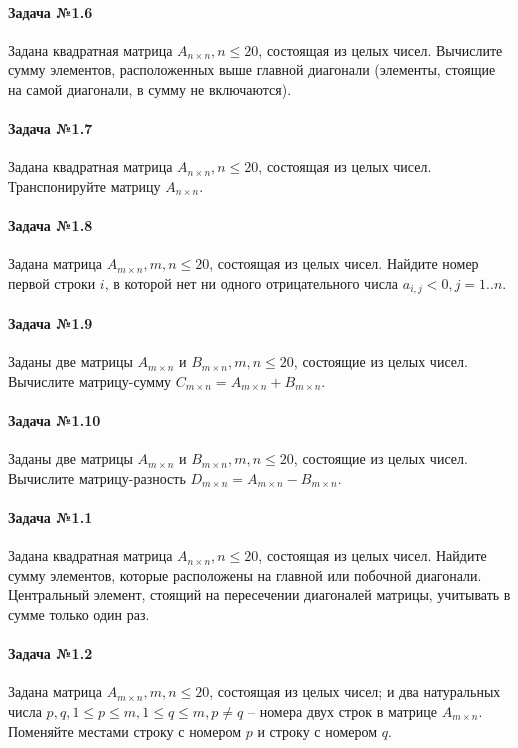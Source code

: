\documentclass[12pt,a4paper]{report}
\begin{document}
\paragraph*{Задача №1.6}
Задана квадратная матрица $A_{n \times n}, n \le 20$, состоящая из целых чисел. Вычислите сумму элементов, расположенных выше главной диагонали (элементы, стоящие на самой диагонали, в сумму не включаются).

\paragraph*{Задача №1.7}
Задана квадратная матрица $A_{n \times n}, n \le 20$, состоящая из целых чисел. Транспонируйте матрицу $A_{n \times n}$.

\paragraph*{Задача №1.8}
Задана матрица $A_{m \times n}, m, n \le 20$, состоящая из целых чисел. Найдите номер первой строки $i$, в которой нет ни одного отрицательного числа $a_{i, j} < 0, j=1..n$.

\paragraph*{Задача №1.9}
Заданы две матрицы $A_{m \times n} \text{ и } B_{m \times n}, m, n \le 20$, состоящие из целых чисел. Вычислите матрицу-сумму $C_{m \times n} = A_{m \times n} + B_{m \times n}$.

\paragraph*{Задача №1.10}
Заданы две матрицы $A_{m \times n} \text{ и } B_{m \times n}, m, n \le 20$, состоящие из целых чисел. Вычислите матрицу-разность $D_{m \times n} = A_{m \times n} - B_{m \times n}$.

\paragraph*{Задача №1.1}
Задана квадратная матрица $A_{n \times n}, n \le 20$, состоящая из целых чисел. Найдите сумму элементов, которые расположены на главной или побочной диагонали. Центральный элемент, стоящий на пересечении диагоналей матрицы, учитывать в сумме только один раз.

\paragraph*{Задача №1.2}
Задана матрица $A_{m \times n}, m, n \le 20$, состоящая из целых чисел; и два натуральных числа $p, q, 1 \le p \le m, 1 \le q \le m, p \ne q$ -- номера двух строк в матрице $A_{m \times n}$. Поменяйте местами строку с номером $p$ и строку с номером $q$.
\end{document}
